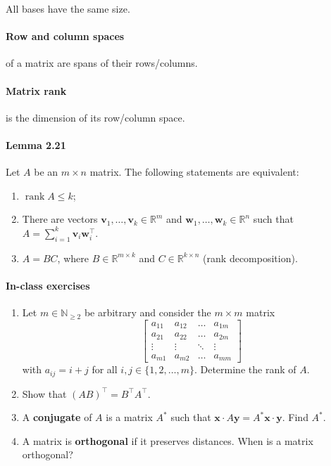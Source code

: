 \documentclass{article}
\begin{document}
All bases have the same size.

\paragraph{Row and column spaces} of a matrix are spans of their rows/columns.

\paragraph{Matrix rank} is the dimension of its row/column space.

\paragraph{Lemma 2.21} Let $A$ be an $m \times n$ matrix. The following statements are equivalent:
\begin{enumerate}
    \item $\operatorname{rank} A \leq k$;
    \item There are vectors $\mathbf{v}_1,\dots,\mathbf{v}_k \in \mathbb R^m$ and $\mathbf{w}_1,\dots,\mathbf{w}_k \in \mathbb R^n$ such that $A = \sum\limits_{i=1}^k \mathbf{v}_i \mathbf{w}_i^\top$.
    \item $A = BC$, where $B \in \mathbb R^{m \times k}$ and $C \in \mathbb R^{k \times n}$ (rank decomposition).
\end{enumerate}

\paragraph{In-class exercises}

\begin{enumerate}
    \item Let $m \in \mathbb N_{\geq 2}$ be arbitrary and consider the $m \times m$ matrix
    $$
    \begin{bmatrix}
        a_{11} & a_{12} & \dots & a_{1m} \\
        a_{21} & a_{22} & \dots & a_{2m} \\
        \vdots & \vdots & \ddots & \vdots \\
        a_{m1} & a_{m2} & \dots & a_{mm}
    \end{bmatrix}
    $$
    with $a_{ij} = i + j$ for all $i,j \in \{1,2,\dots,m\}$. Determine the rank of $A$.
    \item Show that $(AB)^\top = B^\top A^\top$.
    \item A \textbf{conjugate} of $A$ is a matrix $A^*$ such that $\mathbf x \cdot A\mathbf y = A^* \mathbf x \cdot \mathbf y$. Find $A^*$.
    \item A matrix is \textbf{orthogonal} if it preserves distances. When is a matrix orthogonal?
\end{enumerate}
\end{document}
